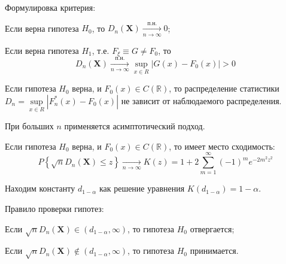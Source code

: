 Формулировка критерия:
\begin{compactlist}
    \item Если верна гипотеза $H_0$, то $D_{n}\left(\mathbf{X}\right) \xrightarrow[n \to \infty]{\text{п.н.}} 0$;
    \item Если верна гипотеза $H_1$, т.е. $F_{\xi} \equiv G \neq F_{0}$, то
    \begin{equation*}
        D_{n}\left(\mathbf{X}\right) \xrightarrow[n \to \infty]{\text{п.н.}} \sup\limits_{x \in R}\left|G(x)-F_{0}(x)\right|>0
    \end{equation*}
\end{compactlist}

\begin{lem}
Если гипотеза $H_0$ верна, и $F_{0}(x) \in C(\mathbb{R})$, то распределение статистики $D_{n}=\sup\limits_{x \in R}|F_{n}^{*}(x)-F_{0}(x)|$ не зависит от наблюдаемого распределения.
\end{lem}

При больших $n$ применяется асимптотический подход.
\begin{namedthm}
Если гипотеза $H_0$ верна, и $F_{0}(x) \in C(\mathbb{R})$, то имеет место сходимость:
\begin{equation*}
    P\left\{\sqrt{n} D_{n}\left(\mathbf{X}\right) \leqslant z\right\} \xrightarrow[n \to \infty]{} K(z)=1+2 \sum\limits_{m=1}^{\infty}(-1)^{m} e^{-2 m^{2} z^{2}}
\end{equation*}
\end{namedthm}

Находим константу $d_{1-\alpha}$ как решение уравнения $K\left(d_{1-\alpha}\right)=1-\alpha$.

Правило проверки гипотез:
\begin{compactlist}
    \item Если $\sqrt{n} D_{n}\left(\mathbf{X}\right) \in\left(d_{1-\alpha}, \infty\right)$, то гипотеза $H_0$ отвергается;
    \item Если $\sqrt{n} D_{n}\left(\mathbf{X}\right) \notin\left(d_{1-\alpha}, \infty\right)$, то гипотеза $H_0$ принимается.
\end{compactlist}

